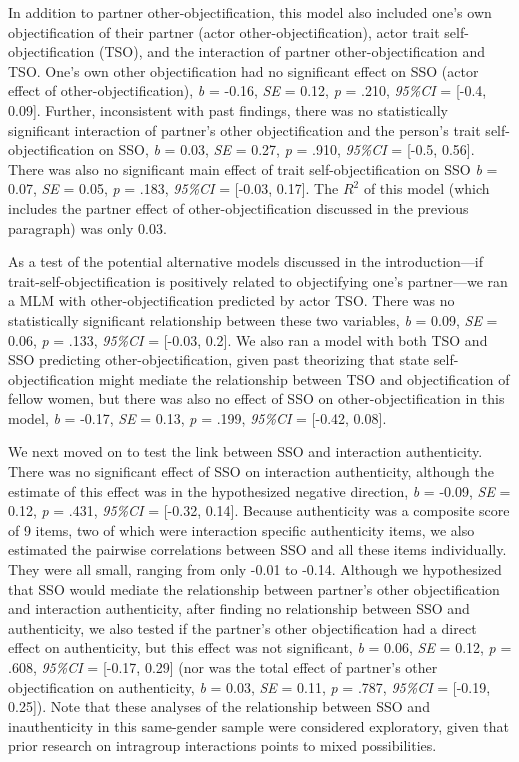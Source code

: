 \documentclass[man]{apa6}
\begin{document}
In addition to partner other-objectification, this model also included
one's own objectification of their partner (actor
other-objectification), actor trait self-objectification (TSO), and the
interaction of partner other-objectification and TSO. One's own other
objectification had no significant effect on SSO (actor effect of
other-objectification), \emph{b} = -0.16, \emph{SE} = 0.12, \emph{p} =
.210, \emph{95\%CI} = {[}-0.4, 0.09{]}. Further, inconsistent with past
findings, there was no statistically significant interaction of
partner's other objectification and the person's trait
self-objectification on SSO, \emph{b} = 0.03, \emph{SE} = 0.27, \emph{p}
= .910, \emph{95\%CI} = {[}-0.5, 0.56{]}. There was also no significant
main effect of trait self-objectification on SSO \emph{b} = 0.07,
\emph{SE} = 0.05, \emph{p} = .183, \emph{95\%CI} = {[}-0.03, 0.17{]}.
The \(R^2\) of this model (which includes the partner effect of
other-objectification discussed in the previous paragraph) was only
0.03.

As a test of the potential alternative models discussed in the
introduction---if trait-self-objectification is positively related to
objectifying one's partner---we ran a MLM with other-objectification
predicted by actor TSO. There was no statistically significant
relationship between these two variables, \emph{b} = 0.09, \emph{SE} =
0.06, \emph{p} = .133, \emph{95\%CI} = {[}-0.03, 0.2{]}. We also ran a
model with both TSO and SSO predicting other-objectification, given past
theorizing that state self-objectification might mediate the
relationship between TSO and objectification of fellow women, but there
was also no effect of SSO on other-objectification in this model,
\emph{b} = -0.17, \emph{SE} = 0.13, \emph{p} = .199, \emph{95\%CI} =
{[}-0.42, 0.08{]}.

We next moved on to test the link between SSO and interaction
authenticity. There was no significant effect of SSO on interaction
authenticity, although the estimate of this effect was in the
hypothesized negative direction, \emph{b} = -0.09, \emph{SE} = 0.12,
\emph{p} = .431, \emph{95\%CI} = {[}-0.32, 0.14{]}. Because authenticity
was a composite score of 9 items, two of which were interaction specific
authenticity items, we also estimated the pairwise correlations between
SSO and all these items individually. They were all small, ranging from
only -0.01 to -0.14. Although we hypothesized that SSO would mediate the
relationship between partner's other objectification and interaction
authenticity, after finding no relationship between SSO and
authenticity, we also tested if the partner's other objectification had
a direct effect on authenticity, but this effect was not significant,
\emph{b} = 0.06, \emph{SE} = 0.12, \emph{p} = .608, \emph{95\%CI} =
{[}-0.17, 0.29{]} (nor was the total effect of partner's other
objectification on authenticity, \emph{b} = 0.03, \emph{SE} = 0.11,
\emph{p} = .787, \emph{95\%CI} = {[}-0.19, 0.25{]}). Note that these
analyses of the relationship between SSO and inauthenticity in this
same-gender sample were considered exploratory, given that prior
research on intragroup interactions points to mixed possibilities.
\end{document}
